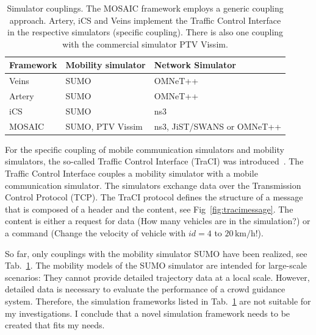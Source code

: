\begin{table}[hbt!]
\centering
\begin{tabular}{lll}
 \hline 
 Framework & Mobility simulator & Network Simulator  \\ 
 \hline 
 Veins & SUMO & OMNeT++   \\ 
 Artery & SUMO & OMNeT++  \\ 
 iCS & SUMO & ns3  \\ 
 MOSAIC & SUMO, PTV Vissim & ns3, JiST/SWANS or OMNeT++  \\ 
 \hline 
 \end{tabular}  
 \caption[Simulator couplings]{Simulator couplings. The MOSAIC framework employs a generic coupling approach. Artery, iCS and Veins implement the Traffic Control Interface in the respective simulators (specific coupling). There is also one coupling with the commercial simulator PTV Vissim. }
\label{tab:networkmiddleware}
\end{table}

\newpage


For the specific coupling of mobile communication simulators and mobility simulators, the so-called Traffic Control Interface (TraCI) was introduced~\cite{wegener-2008-com}. The Traffic Control Interface couples a mobility simulator with a mobile communication simulator. The simulators exchange data over the Transmission Control Protocol (TCP). The TraCI protocol defines the structure of a message that is composed of a header and the content, see Fig~\ref{fig:tracimessage}. The content is either a request for data (How many vehicles are in the simulation?) or a command (Change the velocity of vehicle with $id=4$ to $20\,\text{km/h}$!). 


So far, only couplings  with the mobility simulator SUMO have been realized, see Tab.~\ref{tab:networkmiddleware}. The mobility models of the SUMO simulator are intended for large-scale scenarios: They cannot provide detailed trajectory data at a local scale. However, detailed data is necessary to evaluate the performance of a crowd guidance system. Therefore, the simulation frameworks listed in Tab.~\ref{tab:networkmiddleware} are not suitable for my investigations. I conclude that a novel simulation framework needs to be created that fits my needs.



